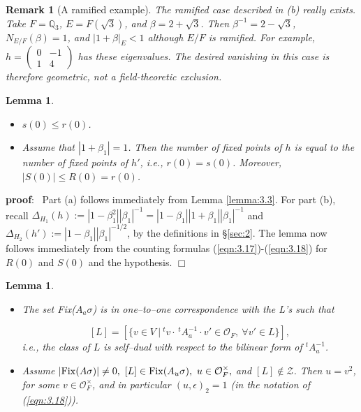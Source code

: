\documentclass[12pt,letterpaper]{amsart}
\numberwithin{equation}{section}
\newtheorem{lemma}[theorem]{Lemma}
\newtheorem{draftremark}{Remark}
\theoremstyle{definition}
\theoremstyle{plain}
\providecommand{\cal}{\mathcal}
\def\zz{{\cal Z}}
\def\pf{{\bf proof}:\ }
\def\qed{$\Box$}
\def\eps{\epsilon}
\def\off{{\cal O}_F}
\begin{document}
\begin{draftremark}[A ramified example]
\label{rem:ramified-example}
The ramified case described in (b) really exists. Take
$F=\mathbb Q_3$, $E=F(\sqrt3)$, and $\beta=2+\sqrt3$.
Then $\beta^{-1}=2-\sqrt3$, $N_{E/F}(\beta)=1$,
and $|1+\beta|_E<1$ although $E/F$ is ramified.
For example, $h=\left(\begin{smallmatrix}0&-1\\1&4\end{smallmatrix}\right)$
has these eigenvalues. The desired vanishing in this case is therefore
geometric, not a field-theoretic exclusion.
\end{draftremark}

\begin{lemma}
\label{lemma:5.1}
\begin{itemize}
\item[(a)] 
$s(0)\leq r(0)$.

\item[(b)] 
Assume that $|1+\beta_1|=1$. Then the number of
fixed points of $h$ is equal to the number of fixed points of $h'$,
i.e., $r(0)=s(0)$. Moreover, $|S(0)|\leq R(0)=r(0)$.
\end{itemize}
\end{lemma}

\pf
Part (a) follows immediately from Lemma \ref{lemma:3.3}. 
For part (b), recall $\Delta_{H_1}(h):=|1-\beta_1^2||\beta_1|^{-1}
=|1-\beta_1||1+\beta_1||\beta_1|^{-1}$ and
$\Delta_{H_2}(h'):=|1-\beta_1||\beta_1|^{-1/2}$, 
by the definitions in \S \ref{sec:2}.
The lemma now follows immediately from the counting 
formulas (\ref{eqn:3.17})-(\ref{eqn:3.18}) for
$R(0)$ and $S(0)$ and the hypothesis.
\qed

\begin{lemma}
\label{lemma:5.2}
\begin{itemize}
\item[(a)] 
The set {\rm Fix}($A_a\sigma$) is in one--to--one correspondence with the
L's such that

\[
[L] = [\{v\in V\ |\ {^{t}v}\cdot \, ^tA_a^{-1}\cdot v'\in \off ,
\ \forall v'\in L\}],
\]
i.e., the class of $L$ is self--dual with respect to the bilinear form of
$^tA_a^{-1}$.

\item[(b)] 
Assume $|{\rm Fix}(A\sigma )|\not= 0,\
[L]\in {\rm Fix}(A_u\sigma ),\ u\in \off^{\times},$
and $[L]\notin\zz$. Then $u=v^2$, for some $v\in\off^{\times}$, and in
particular $(u,\eps)_2=1$ (in the notation of (\ref{eqn:3.18})).
\end{itemize}
\end{lemma}
\end{document}
